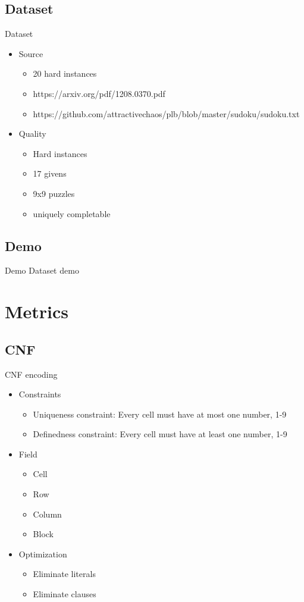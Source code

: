 \documentclass[11pt]{beamer}
\begin{document}
\subsection{Dataset}

\begin{frame}{Dataset}
\begin{itemize}
\item Source
\begin{itemize}
\item 20 hard instances
\item https://arxiv.org/pdf/1208.0370.pdf
\item https://github.com/attractivechaos/plb/blob/master/sudoku/sudoku.txt
\end{itemize}
\item Quality
\begin{itemize}
\item Hard instances
\item 17 givens
\item 9x9 puzzles
\item uniquely completable
\end{itemize}
\end{itemize}
\end{frame}

\subsection{Demo}
\begin{frame}{Demo}
Dataset demo
\end{frame}

\section{Metrics}


\subsection{CNF}
\begin{frame}{CNF encoding}
\begin{itemize}
\item Constraints
\begin{itemize}
\item Uniqueness constraint: Every cell must have at most one number, 1-9
\item Definedness constraint: Every cell must have at least one number, 1-9
\end{itemize}
\item Field
\begin{itemize}
\item Cell
\item Row
\item Column
\item Block
\end{itemize}
\item Optimization
\begin{itemize}
\item Eliminate literals
\item Eliminate clauses
\end{itemize}
\end{itemize}
\end{frame}
\end{document}
